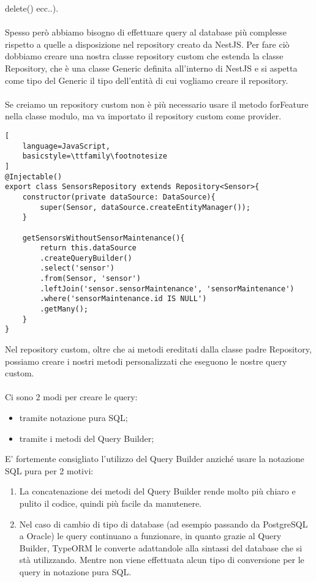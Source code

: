 delete() ecc..).
\\\\
Spesso però abbiamo bisogno di effettuare query al database più complesse rispetto a quelle a disposizione nel repository
creato da NestJS. Per fare ciò dobbiamo creare una nostra classe repository custom che estenda la classe Repository, che è una
classe Generic definita all'interno di NestJS e si aspetta come tipo del Generic il tipo dell'entità di cui vogliamo 
creare il repository.
\\\\
Se creiamo un repository custom non è più necessario usare il metodo forFeature nella classe modulo, ma va importato il repository custom
come provider.
\\ 

\begin{lstlisting}[
    language=JavaScript,
    basicstyle=\ttfamily\footnotesize
]
@Injectable()
export class SensorsRepository extends Repository<Sensor>{
    constructor(private dataSource: DataSource){
        super(Sensor, dataSource.createEntityManager());
    }

    getSensorsWithoutSensorMaintenance(){
        return this.dataSource
        .createQueryBuilder()
        .select('sensor')
        .from(Sensor, 'sensor')
        .leftJoin('sensor.sensorMaintenance', 'sensorMaintenance')
        .where('sensorMaintenance.id IS NULL')
        .getMany();
    }
}
\end{lstlisting}
\leavevmode\newline
Nel repository custom, oltre che ai metodi ereditati dalla classe padre Repository, possiamo creare i nostri metodi personalizzati
che eseguono le nostre query custom. 
\\\\
Ci sono 2 modi per creare le query:
\begin{itemize}
    \item tramite notazione pura SQL;
    \item tramite i metodi del Query Builder;
\end{itemize}
\leavevmode\newline
E' fortemente consigliato l'utilizzo del Query Builder anziché usare la notazione SQL pura per 2 motivi:
\begin{enumerate}
    \item La concatenazione dei metodi del Query Builder rende molto più chiaro e pulito il codice, quindi più facile
        da manutenere.
    \item Nel caso di cambio di tipo di database (ad esempio passando da PostgreSQL a Oracle) le query continuano a funzionare, in 
        quanto grazie al Query Builder,
        TypeORM le converte adattandole alla sintassi del database che si stà utilizzando. Mentre non viene 
        effettuata alcun tipo di conversione per le query in notazione pura SQL.
\end{enumerate}
